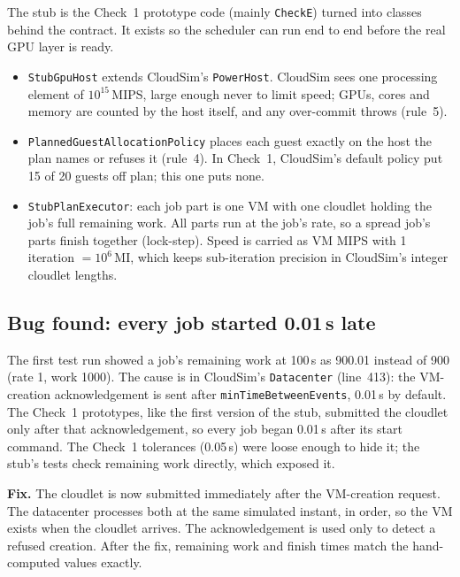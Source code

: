 \documentclass[11pt,a4paper]{article}
\newcommand{\code}[1]{\texttt{#1}}
\begin{document}
The stub is the Check~1 prototype code (mainly \code{CheckE}) turned into classes behind
the contract. It exists so the scheduler can run end to end before the real GPU layer is ready.

\begin{itemize}
  \item \code{StubGpuHost} extends CloudSim's \code{PowerHost}. CloudSim sees one processing
        element of $10^{15}$\,MIPS, large enough never to limit speed; GPUs, cores and memory
        are counted by the host itself, and any over-commit throws (rule~5).
  \item \code{PlannedGuestAllocationPolicy} places each guest exactly on the host the plan names
        or refuses it (rule~4). In Check~1, CloudSim's default policy put 15 of 20 guests
        off plan; this one puts none.
  \item \code{StubPlanExecutor}: each job part is one VM with one cloudlet holding the job's full
        remaining work. All parts run at the job's rate, so a spread job's parts finish together
        (lock-step). Speed is carried as VM MIPS with 1 iteration $= 10^6$\,MI, which keeps
        sub-iteration precision in CloudSim's integer cloudlet lengths.
\end{itemize}

\subsection{Bug found: every job started 0.01\,s late}
The first test run showed a job's remaining work at 100\,s as 900.01 instead of 900 (rate 1, work
1000). The cause is in CloudSim's \code{Datacenter} (line~413): the VM-creation acknowledgement is
sent after \code{minTimeBetweenEvents}, 0.01\,s by default. The Check~1 prototypes, like the first
version of the stub, submitted the cloudlet only after that acknowledgement, so every job began
0.01\,s after its start command. The Check~1 tolerances (0.05\,s) were loose enough to hide it;
the stub's tests check remaining work directly, which exposed it.

\textbf{Fix.} The cloudlet is now submitted immediately after the VM-creation request. The
datacenter processes both at the same simulated instant, in order, so the VM exists when the
cloudlet arrives. The acknowledgement is used only to detect a refused creation. After the fix,
remaining work and finish times match the hand-computed values exactly.

\end{document}
